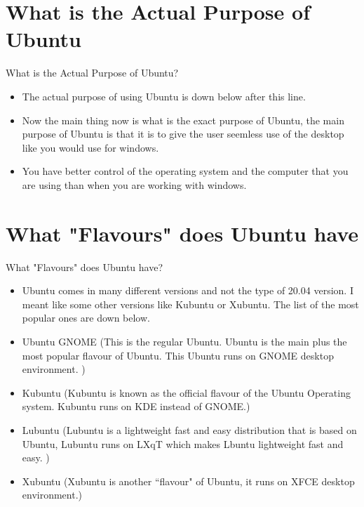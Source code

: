 \documentclass[aspectratio=43]{beamer}
\begin{document}
\section{What is the Actual Purpose of Ubuntu}
\begin{frame}{What is the Actual Purpose of Ubuntu?}
	\begin{itemize}
		\item The actual purpose of using Ubuntu is down below after this line.
		\item Now the main thing now is what is the exact purpose of Ubuntu, the 		main purpose of Ubuntu is that it is to give the user seemless use of the desktop 		like you would use for windows.
	\item You have better control of the operating system and the computer that you are using than when you are working with windows.
	\end{itemize}
\end{frame}



	\section{What "Flavours" does Ubuntu have }
	\begin{frame}{What "Flavours" does Ubuntu have?}
	\begin{block}{}
	\begin{itemize}
	\item Ubuntu comes in many different versions and not the type of 20.04 version. I meant like some other versions like Kubuntu or Xubuntu. The list of the most popular ones are down below.
	\item Ubuntu GNOME (This is the regular Ubuntu. Ubuntu is the main plus the most popular flavour of Ubuntu. This Ubuntu runs on GNOME desktop environment. )
	\item Kubuntu (Kubuntu is known as the official flavour of the Ubuntu Operating system. Kubuntu runs on KDE instead of GNOME.)
	\item Lubuntu (Lubuntu is a lightweight fast and easy distribution that is based on Ubuntu, Lubuntu runs on LXqT which makes Lbuntu lightweight fast and easy. )
	\item Xubuntu (Xubuntu is another ``flavour" of Ubuntu, it runs on XFCE desktop environment.)
	\end{itemize}
	\end{block}
	\end{frame}
\end{document}
